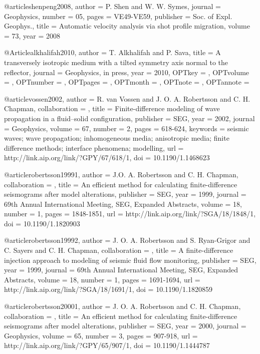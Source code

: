 @article{shenpeng2008,
  author = {P. Shen and W. W. Symes},
  journal = {Geophysics},
  number = {05},
  pages = {VE49-VE59},
  publisher = {Soc. of Expl. Geophys.},
  title = {Automatic velocity analysis via shot profile migration},
  volume = {73},
  year = {2008}}

@Article{alkhalifah2010,
  author = 	 {T. Alkhalifah and P. Sava},
  title = 	 {A transversely isotropic medium with a tilted
                  symmetry axis normal to the reflector},
  journal = 	 {Geophysics, in press},
  year = 	 {2010},
  OPTkey = 	 {},
  OPTvolume = 	 {},
  OPTnumber = 	 {},
  OPTpages = 	 {},
  OPTmonth = 	 {},
  OPTnote = 	 {},
  OPTannote = 	 {}
}


@article{vossen2002,
author = {R. van Vossen and J. O. A. Robertsson and C. H. Chapman},
collaboration = {},
title = {Finite-difference modeling of wave propagation in a fluid--solid configuration},
publisher = {SEG},
year = {2002},
journal = {Geophysics},
volume = {67},
number = {2},
pages = {618-624},
keywords = {seismic waves; wave propagation; inhomogeneous media; anisotropic media; finite difference methods; interface phenomena; modelling},
url = {http://link.aip.org/link/?GPY/67/618/1},
doi = {10.1190/1.1468623}
}

@article{robertsson19991,
author = {J.O. A. Robertsson and C. H. Chapman},
collaboration = {},
title = {An efficient method for calculating finite-difference seismograms after model alterations},
publisher = {SEG},
year = {1999},
journal = {69th Annual International Meeting, SEG, Expanded Abstracts},
volume = {18},
number = {1},
pages = {1848-1851},
url = {http://link.aip.org/link/?SGA/18/1848/1},
doi = {10.1190/1.1820903}
}

@article{robertsson19992,
author = {J. O. A. Robertsson and S.  Ryan-Grigor and C. Sayers and C. H. Chapman},
collaboration = {},
title = {A finite-difference injection approach to modeling of seismic fluid flow monitoring},
publisher = {SEG},
year = {1999},
journal = {69th Annual International Meeting, SEG, Expanded Abstracts},
volume = {18},
number = {1},
pages = {1691-1694},
url = {http://link.aip.org/link/?SGA/18/1691/1},
doi = {10.1190/1.1820859}
}

@article{robertsson20001,
author = {J. O. A. Robertsson and C. H. Chapman},
collaboration = {},
title = {An efficient method for calculating finite-difference seismograms after model alterations},
publisher = {SEG},
year = {2000},
journal = {Geophysics},
volume = {65},
number = {3},
pages = {907-918},
url = {http://link.aip.org/link/?GPY/65/907/1},
doi = {10.1190/1.1444787}
}

